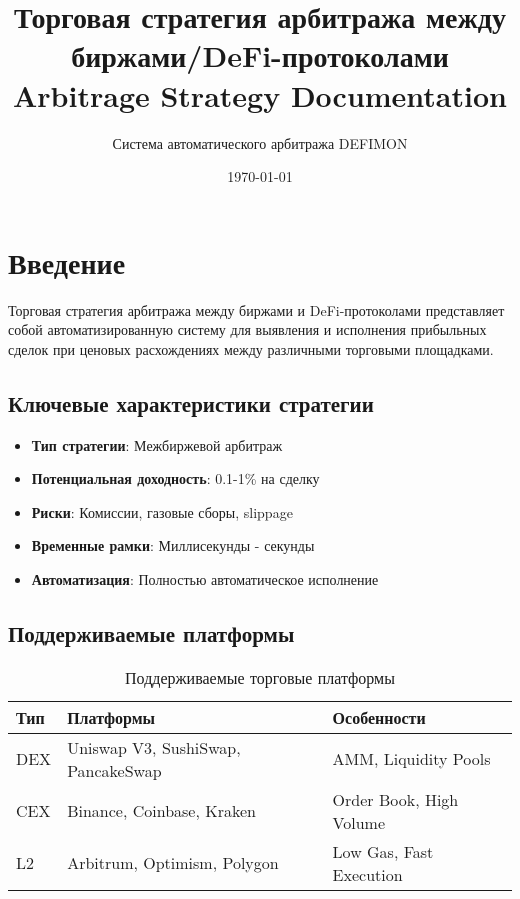 \documentclass[a4paper,11pt]{article}
\title{Торговая стратегия арбитража между биржами/DeFi-протоколами\\
\large Arbitrage Strategy Documentation}
\author{Система автоматического арбитража DEFIMON}
\date{\today}
\begin{document}
\maketitle

\tableofcontents
\newpage

\section{Введение}

Торговая стратегия арбитража между биржами и DeFi-протоколами представляет собой автоматизированную систему для выявления и исполнения прибыльных сделок при ценовых расхождениях между различными торговыми площадками.

\subsection{Ключевые характеристики стратегии}

\begin{itemize}
    \item \textbf{Тип стратегии}: Межбиржевой арбитраж
    \item \textbf{Потенциальная доходность}: 0.1-1\% на сделку
    \item \textbf{Риски}: Комиссии, газовые сборы, slippage
    \item \textbf{Временные рамки}: Миллисекунды - секунды
    \item \textbf{Автоматизация}: Полностью автоматическое исполнение
\end{itemize}

\subsection{Поддерживаемые платформы}

\begin{table}[H]
\centering
\begin{tabular}{|l|l|l|}
\hline
\textbf{Тип} & \textbf{Платформы} & \textbf{Особенности} \\
\hline
DEX & Uniswap V3, SushiSwap, PancakeSwap & AMM, Liquidity Pools \\
CEX & Binance, Coinbase, Kraken & Order Book, High Volume \\
L2 & Arbitrum, Optimism, Polygon & Low Gas, Fast Execution \\
\hline
\end{tabular}
\caption{Поддерживаемые торговые платформы}
\end{table}
\end{document}
